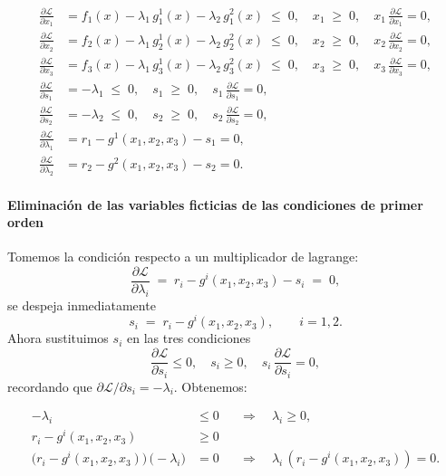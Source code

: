 \documentclass{article}
\begin{document}
\[
\begin{aligned}
\frac{\partial\mathcal L}{\partial x_1}
&= f_{1}(x)-\lambda_1\,g^1_{1}(x)-\lambda_2\,g^2_{1}(x)
\;\le\;0,\quad
x_1\;\ge\;0,\quad
x_1\,\frac{\partial\mathcal L}{\partial x_1}=0,\\[6pt]
\frac{\partial\mathcal L}{\partial x_2}
&= f_{2}(x)-\lambda_1\,g^1_{2}(x)-\lambda_2\,g^2_{2}(x)
\;\le\;0,\quad
x_2\;\ge\;0,\quad
x_2\,\frac{\partial\mathcal L}{\partial x_2}=0,\\[6pt]
\frac{\partial\mathcal L}{\partial x_3}
&= f_{3}(x)-\lambda_1\,g^1_{3}(x)-\lambda_2\,g^2_{3}(x)
\;\le\;0,\quad
x_3\;\ge\;0,\quad
x_3\,\frac{\partial\mathcal L}{\partial x_3}=0,\\[6pt]
\frac{\partial\mathcal L}{\partial s_1}
&= -\lambda_1
\;\le\;0,\quad
s_1\;\ge\;0,\quad
s_1\,\frac{\partial\mathcal L}{\partial s_1}=0,\\[6pt]
\frac{\partial\mathcal L}{\partial s_2}
&= -\lambda_2
\;\le\;0,\quad
s_2\;\ge\;0,\quad
s_2\,\frac{\partial\mathcal L}{\partial s_2}=0,\\[6pt]
\frac{\partial\mathcal L}{\partial \lambda_1}
&= r_1 - g^1(x_1,x_2,x_3) - s_1 = 0,\\
\frac{\partial\mathcal L}{\partial \lambda_2}
&= r_2 - g^2(x_1,x_2,x_3) - s_2 = 0.
\end{aligned}
\]




\paragraph{Eliminación de las variables ficticias de las condiciones de primer orden\\}
Tomemos la condición respecto a un multiplicador de lagrange:
\[
\frac{\partial\mathcal L}{\partial \lambda_i}
\;=\;
r_i - g^i(x_1,x_2,x_3) - s_i
\;=\;0,
\]
se despeja inmediatamente
\[
s_i \;=\; r_i - g^i(x_1,x_2,x_3),
\qquad i=1,2.
\]
Ahora sustituimos \(s_i\) en las tres condiciones
\[
\frac{\partial\mathcal L}{\partial s_i}\le0,\quad
s_i\ge0,\quad
s_i\,\frac{\partial\mathcal L}{\partial s_i}=0,
\]
recordando que \(\partial\mathcal L/\partial s_i=-\lambda_i\). Obtenemos:

\[
\begin{aligned}
-\lambda_i &\le0
&&\Longrightarrow\quad \lambda_i\ge0,\\
r_i - g^i(x_1,x_2,x_3) &\ge0
&&\\
\bigl(r_i - g^i(x_1,x_2,x_3)\bigr)\,\bigl(-\lambda_i\bigr)&=0
&&\Longrightarrow\quad \lambda_i\,(r_i - g^i(x_1,x_2,x_3))=0.
\end{aligned}
\]
\end{document}
